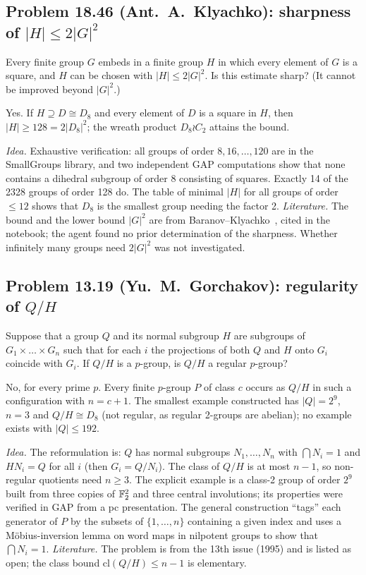\subsection{Problem 18.46 (Ant.~A.~Klyachko): sharpness of $|H|\le 2|G|^2$}
\begin{problem}[18.46]
Every finite group $G$ embeds in a finite group $H$ in which every element of $G$ is a square, and $H$ can be
chosen with $|H|\le 2|G|^2$. Is this estimate sharp? (It cannot be improved beyond $|G|^2$.)
\end{problem}
\begin{theorem}\label{thm:1846}
Yes. If $H\supseteq D\cong D_8$ and every element of $D$ is a square in $H$, then $|H|\ge 128=2|D_8|^2$; the wreath
product $D_8\wr C_2$ attains the bound.
\end{theorem}
\emph{Idea.} Exhaustive verification: all groups of order $8,16,\dots,120$ are in the SmallGroups library, and two
independent GAP computations show that none contains a dihedral subgroup of order 8 consisting of squares.
Exactly 14 of the 2328 groups of order 128 do. The table of minimal $|H|$ for all groups of order $\le 12$
shows that $D_8$ is the smallest group needing the factor 2. \emph{Literature.} The bound and the
lower bound $|G|^2$ are from Baranov--Klyachko~\cite{BK}, cited in the notebook; the agent found no prior
determination of the sharpness. Whether infinitely many groups need $2|G|^2$ was not investigated.

\subsection{Problem 13.19 (Yu.~M.~Gorchakov): regularity of $Q/H$}
\begin{problem}[13.19]
Suppose that a group $Q$ and its normal subgroup $H$ are subgroups of $G_1\times\dots\times G_n$ such that for each
$i$ the projections of both $Q$ and $H$ onto $G_i$ coincide with $G_i$. If $Q/H$ is a $p$-group, is $Q/H$ a
regular $p$-group?
\end{problem}
\begin{theorem}\label{thm:1319}
No, for every prime $p$. Every finite $p$-group $P$ of class $c$ occurs as $Q/H$ in
such a configuration with $n=c+1$. The smallest example constructed has $|Q|=2^9$, $n=3$ and $Q/H\cong D_8$ (not
regular, as regular 2-groups are abelian); no example exists with $|Q|\le 192$.
\end{theorem}
\emph{Idea.} The reformulation is: $Q$ has normal subgroups $N_1,\dots,N_n$ with $\bigcap N_i=1$ and $HN_i=Q$
for all $i$ (then $G_i=Q/N_i$). The class of $Q/H$ is at most $n-1$, so non-regular quotients need $n\ge 3$. The
explicit example is a class-2 group of order $2^9$ built from three copies of $\mathbb{F}_2^2$ and three central
involutions; its properties were verified in GAP from a pc presentation. The general construction ``tags'' each
generator of $P$ by the subsets of $\{1,\dots,n\}$ containing a given index and uses a Möbius-inversion lemma on
word maps in nilpotent groups to show that $\bigcap N_i=1$. \emph{Literature.} The problem is from the 13th issue
(1995) and is listed as open; the class bound $\mathrm{cl}(Q/H)\le n-1$ is elementary.
